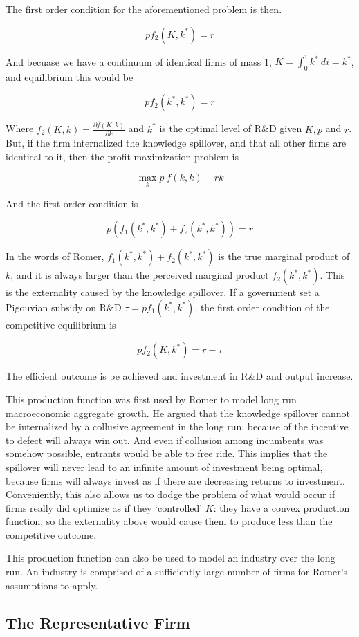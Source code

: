 \documentclass{article}
\begin{document}
The first order condition for the aforementioned problem is then.

\[
p f_2(K,k^*) = r
\]

And becuase we have a continuum of identical firms of mass 1, $K = \int_0^1 k^* ~ di = k^*$, and equilibrium this would be

\[
p f_2(k^*,k^*) = r
\]

Where $f_2(K,k) = \frac{\partial f(K,k)}{\partial k}$ and $k^*$ is the optimal level of R\&D given $K, p$ and $r$. But, if the firm internalized the knowledge spillover, and that all other firms are identical to it, then the profit maximization problem is

\[
\max_k p\:f(k,k) - rk
\]

And the first order condition is

\[
p \left( f_1(k^*,k^*) +  f_2(k^*,k^*)\right)= r
\]

In the words of Romer, $f_1(k^*,k^*) +  f_2(k^*,k^*)$ is the true marginal product of $k$, and it is always larger than the perceived marginal product $f_2(k^*, k^*)$. This is the externality caused by the knowledge spillover. If a government set a Pigouvian subsidy on R\&D $\tau = pf_1(k^*, k^*)$, the first order condition of the competitive equilibrium is

\[
p f_2(K,k^*) = r - \tau 
\]
 
The efficient outcome is be achieved and investment in R\&D and output increase.

This production function was first used by Romer to model long run macroeconomic aggregate growth. He argued that the knowledge spillover cannot be internalized by a collusive agreement in the long run, because of the incentive to defect will always win out. And even if collusion among incumbents was somehow possible, entrants would be able to free ride. This implies that the spillover will never lead to an infinite amount of investment being optimal, because firms will always invest as if there are decreasing returns to investment. Conveniently, this also allows us to dodge the problem of what would occur if firms really did optimize as if they `controlled' $K$: they have a convex production function, so the externality above would cause them to produce less than the competitive outcome. 

This production function can also be used to model an industry over the long run. An industry is comprised of a sufficiently large number of firms for Romer's assumptions to apply. 

\subsection{The Representative Firm}
\end{document}
